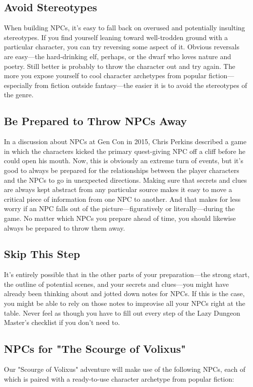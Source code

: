 \documentclass[10pt,a4paper,twoside,bg=print,twocolumn,openany,nodeprecatedcode]{dndbook}
\begin{document}
\subsection{Avoid Stereotypes}
When building NPCs, it's easy to fall back on overused and potentially insulting stereotypes. If you find yourself leaning toward well-trodden ground with a particular character, you can try reversing some aspect of it. Obvious reversals are easy—the hard-drinking elf, perhaps, or the dwarf who loves nature and poetry. Still better is probably to throw the character out and try again. The more you expose yourself to cool character archetypes from popular fiction—especially from fiction outside fantasy—the easier it is to avoid the stereotypes of the genre.
\subsection{Be Prepared to Throw NPCs Away}
In a discussion about NPCs at Gen Con in 2015, Chris Perkins described a game in which the characters kicked the primary quest-giving NPC off a cliff before he could open his mouth. Now, this is obviously an extreme turn of events, but it's good to always be prepared for the relationships between the player characters and the NPCs to go in unexpected directions.
Making sure that secrets and clues are always kept abstract from any particular source makes it easy to move a critical piece of information from one NPC to another. And that makes for less worry if an NPC falls out of the picture—figuratively or literally—during the game. No matter which NPCs you prepare ahead of time, you should likewise always be prepared to throw them away.
\subsection{Skip This Step}
It's entirely possible that in the other parts of your preparation—the strong start, the outline of potential scenes, and your secrets and clues—you might have already been thinking about and jotted down notes for NPCs. If this is the case, you might be able to rely on those notes to improvise all your NPCs right at the table. Never feel as though you have to fill out every step of the Lazy Dungeon Master's checklist if you don't need to.
\subsection{NPCs for "The Scourge of Volixus"}
Our "Scourge of Volixus" adventure will make use of the following NPCs, each of which is paired with a ready-to-use character archetype from popular fiction:
\end{document}
